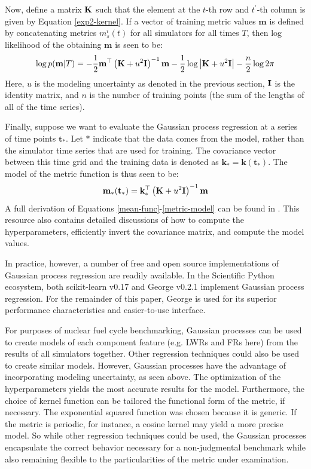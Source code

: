 Now, define a matrix $\mathbf{K}$ such that the element at the $t$-th row and $t^\prime$-th
column is given by Equation \ref{exp2-kernel}. If a vector of training metric 
values $\mathbf{m}$ is defined by concatenating metrics $m_s^i(t)$ for all 
simulators
for all times $T$, then log likelihood of the obtaining $\mathbf{m}$ 
is seen to be:
\begin{equation}
\label{log-p}
\log p(\mathbf{m}|T) = -\frac{1}{2}\mathbf{m}^\top\left(\mathbf{K} + u^2\mathbf{I}\right)^{-1}\mathbf{m}
                       -\frac{1}{2}\log\left|\mathbf{K} + u^2\mathbf{I}\right|
                       -\frac{n}{2}\log 2\pi
\end{equation}
Here, $u$ is the modeling uncertainty as denoted in the previous section, 
$\mathbf{I}$ is the identity matrix, and $n$ is the number of training points (the 
sum of the lengths of all of the time series).

Finally, suppose we want to evaluate the Gaussian process regression at a 
series of time points $\mathbf{t_*}$. Let $*$ indicate that the data comes from 
the model, rather than the simulator time series that are used for training. 
The covariance vector between this time grid and the training data is denoted
as $\mathbf{k}_* = \mathbf{k}(\mathbf{t_*})$. The model of the metric function is 
thus seen to be:
\begin{equation}
\label{metric-model}
\mathbf{m}_*(\mathbf{t}_*) = \mathbf{k}_*^\top \left(\mathbf{K} + u^2\mathbf{I}\right)^{-1}\mathbf{m}
\end{equation}
A full derivation of Equations \ref{mean-func}-\ref{metric-model} can be found in 
\cite{rasmussen2006gaussian}. This resource also contains detailed discussions of 
how to compute the hyperparameters, efficiently invert the covariance matrix, 
and compute the model values. 

In practice, however, a number of free and open source implementations of Gaussian 
process regression are readily available. In the Scientific Python ecosystem, both 
scikit-learn v0.17 \cite{scikit-learn} and George v0.2.1 \cite{hodlr} implement 
Gaussian process regression. For the remainder of this paper, George is used
for its superior performance characteristics and easier-to-use interface.

For purposes of nuclear fuel cycle benchmarking, Gaussian processes can be used to
create models of each component feature (e.g. LWRs and FRs here) from the 
results of all simulators together. Other regression techniques could also be used 
to create similar models.  However, Gaussian processes have the advantage of 
incorporating modeling uncertainty, as seen above. The optimization of the 
hyperparameters yields the most accurate results for the model. Furthermore, the 
choice of kernel function can be tailored the functional form of the metric, if 
necessary. The exponential squared function was chosen because it is generic. If the 
metric is periodic, for instance, a cosine kernel may yield a more precise model. 
So while other regression techniques could be used, the Gaussian processes 
encapsulate the correct behavior necessary for a non-judgmental benchmark while 
also remaining flexible to the particularities of the metric under examination.

